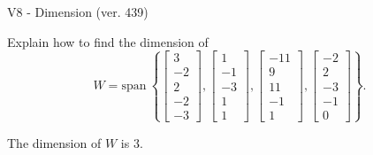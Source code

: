 \begin{exercise}
  \begin{exerciseTitle}V8 - Dimension (ver. 439)\end{exerciseTitle}
  \begin{exerciseStatement}
    Explain how to find the dimension of 
\[W=\mathrm{span}\ \left\{\left[\begin{array}{r}
3 \\
-2 \\
2 \\
-2 \\
-3
\end{array}\right] , \left[\begin{array}{r}
1 \\
-1 \\
-3 \\
1 \\
1
\end{array}\right] , \left[\begin{array}{r}
-11 \\
9 \\
11 \\
-1 \\
1
\end{array}\right] , \left[\begin{array}{r}
-2 \\
2 \\
-3 \\
-1 \\
0
\end{array}\right]\right\}.\]



  \end{exerciseStatement}
  \begin{exerciseAnswer}
   The dimension of \(W\) is  \(3\).
  


  \end{exerciseAnswer}
\end{exercise}